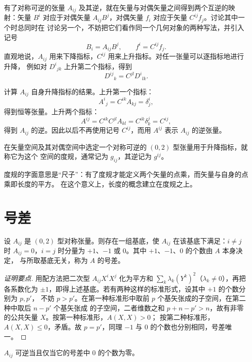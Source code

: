 有了对称可逆的张量 $A_{ij}$ 及其逆，就在矢量与对偶矢量之间得到两个互逆的映射：矢量 $B^i$
对应于对偶矢量 $A_{ij}B^j$，对偶矢量 $f_i$ 对应于矢量 $C^{ij}f_j$。讨论其中一个时总同时在
讨论另一个，不妨把它们看作同一个几何对象的两种写法，并引入记号
\[
B_i=A_{ij}B^j,\qquad f^i=C^{ij}f_j .
\]
直观地说，$A_{ij}$ 用来下降指标，$C^{ij}$ 用来上升指标。对任一张量可以逐指标地进行升降，
例如对 $D^i{}_{jk}$ 上升第二个指标，得到
\[
D^{ij}{}_k=C^{jl}D^i{}_{lk} .
\]

\begin{example}
计算 $A_{ij}$ 自身升降指标的结果。上升第一个指标：
\[
A^i{}_j=C^{ik}A_{kj}=\delta^i_j ,
\]
得到恒等张量。上升两个指标：
\[
A^{ij}=C^{ik}C^{jl}A_{kl}=C^{ik}\delta^j_k=C^{ij},
\]
得到 $A_{ij}$ 的逆。因此以后不再使用记号 $C^{ij}$，而用 $A^{ij}$ 表示 $A_{ij}$ 的逆张量。
\end{example}

\begin{definition}[度规]
在矢量空间及其对偶空间中选定一个对称可逆的 $(0,2)$ 型张量用于升降指标，就称它为这个
空间的度规，通常记为 $g_{ij}$，其逆记为 $g^{ij}$。
\end{definition}

度规的字面意思是“尺子”：有了度规才能定义两个矢量的点乘，而矢量与自身的点乘即长度的平方。
在这个意义上，长度的概念建立在度规之上。

\section{号差}

\begin{theorem}[标准形式与号差]
设 $A_{ij}$ 是 $(0,2)$ 型对称张量。则存在一组基底，使 $A_{ij}$ 在该基底下满足：$i\ne j$ 时
$A_{ij}=0$，$i=j$ 时分量为 $+1$、$-1$ 或 $0$。其中 $+1$、$-1$、$0$ 的个数由 $A$ 本身决定，
与所取基底无关，称为 $A$ 的号差。
\end{theorem}

\begin{proof}[证明要点]
用配方法把二次型 $A_{ij}X^iX^j$ 化为平方和 $\sum_k\lambda_k(Y^k)^2$（$\lambda_k\ne0$），再把
各系数化为 $\pm1$，即得上述基底。若有两种这样的标准形式，设其中 $+1$ 的个数分别为 $p,p'$，
不妨 $p>p'$。在第一种标准形中取前 $p$ 个基矢张成的子空间，在第二种中取后 $n-p'$ 个基矢张成
的子空间，二者维数之和 $p+n-p'>n$，故有非零的公共矢量 $X$。按第一种标准形，$A(X,X)>0$；
按第二种标准形，$A(X,X)\le0$，矛盾。故 $p=p'$，同理 $-1$ 与 $0$ 的个数也分别相同，号差唯一。
\end{proof}

\begin{corollary}
$A_{ij}$ 可逆当且仅当它的号差中 $0$ 的个数为零。
\end{corollary}

